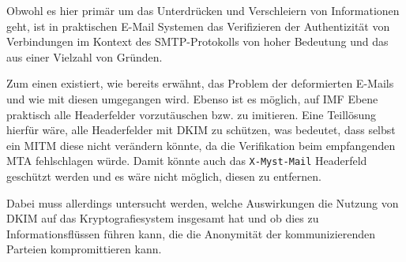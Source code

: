 Obwohl es hier primär um das Unterdrücken und Verschleiern von Informationen geht, ist in praktischen E-Mail Systemen das Verifizieren der Authentizität von Verbindungen im Kontext des SMTP-Protokolls von hoher Bedeutung und das aus einer Vielzahl von Gründen.

Zum einen existiert, wie bereits erwähnt, das Problem der deformierten E-Mails und wie mit diesen umgegangen wird. Ebenso ist es möglich, auf IMF Ebene praktisch alle Headerfelder vorzutäuschen bzw. zu imitieren. Eine Teillösung hierfür wäre, alle Headerfelder mit DKIM  zu schützen, was bedeutet, dass selbst ein MITM diese nicht verändern könnte, da die Verifikation beim empfangenden MTA fehlschlagen würde. Damit könnte auch das \verb#X-Myst-Mail# Headerfeld geschützt werden und es wäre nicht möglich, diesen zu entfernen.

Dabei muss allerdings untersucht werden, welche Auswirkungen die Nutzung von DKIM auf das Kryptografiesystem insgesamt hat und ob dies zu Informationsflüssen führen kann, die die Anonymität der kommunizierenden Parteien kompromittieren kann.
